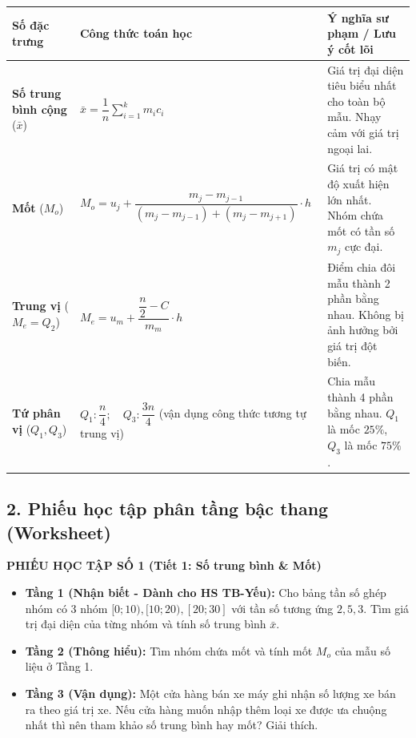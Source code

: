 \documentclass[12pt, a4paper]{article}
\begin{document}
\begin{center}
\small
\begin{tabularx}{\textwidth}{|p{3.2cm}|X|X|}
\hline
\textbf{Số đặc trưng} & \textbf{Công thức toán học} & \textbf{Ý nghĩa sư phạm / Lưu ý cốt lõi} \\ \hline
\textbf{Số trung bình cộng} ($\bar{x}$) & $\bar{x} = \dfrac{1}{n} \sum_{i=1}^k m_i c_i$ & Giá trị đại diện tiêu biểu nhất cho toàn bộ mẫu. Nhạy cảm với giá trị ngoại lai. \\ \hline
\textbf{Mốt} ($M_o$) & $M_o = u_j + \dfrac{m_j - m_{j-1}}{(m_j - m_{j-1}) + (m_j - m_{j+1})} \cdot h$ & Giá trị có mật độ xuất hiện lớn nhất. Nhóm chứa mốt có tần số $m_j$ cực đại. \\ \hline
\textbf{Trung vị} ($M_e = Q_2$) & $M_e = u_m + \dfrac{\dfrac{n}{2} - C}{m_m} \cdot h$ & Điểm chia đôi mẫu thành 2 phần bằng nhau. Không bị ảnh hưởng bởi giá trị đột biến. \\ \hline
\textbf{Tứ phân vị} ($Q_1, Q_3$) & $Q_1: \dfrac{n}{4}; \quad Q_3: \dfrac{3n}{4}$ (vận dụng công thức tương tự trung vị) & Chia mẫu thành 4 phần bằng nhau. $Q_1$ là mốc $25\%$, $Q_3$ là mốc $75\%$. \\ \hline
\end{tabularx}
\end{center}

\subsection*{2. Phiếu học tập phân tầng bậc thang (Worksheet)}

\noindent \textbf{PHIẾU HỌC TẬP SỐ 1 (Tiết 1: Số trung bình \& Mốt)}
\begin{itemize}[leftmargin=0.6cm]
    \item \textbf{Tầng 1 (Nhận biết - Dành cho HS TB-Yếu):} Cho bảng tần số ghép nhóm có 3 nhóm $[0; 10), [10; 20), [20; 30]$ với tần số tương ứng $2, 5, 3$. Tìm giá trị đại diện của từng nhóm và tính số trung bình $\bar{x}$.
    \item \textbf{Tầng 2 (Thông hiểu):} Tìm nhóm chứa mốt và tính mốt $M_o$ của mẫu số liệu ở Tầng 1.
    \item \textbf{Tầng 3 (Vận dụng):} Một cửa hàng bán xe máy ghi nhận số lượng xe bán ra theo giá trị xe. Nếu cửa hàng muốn nhập thêm loại xe được ưa chuộng nhất thì nên tham khảo số trung bình hay mốt? Giải thích.
\end{itemize}
\end{document}

